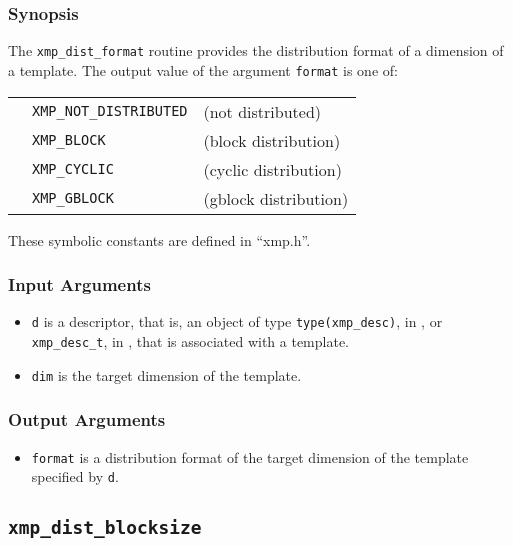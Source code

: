 \subsubsection*{Synopsis}

The {\tt xmp\_dist\_format} routine provides the distribution format of
a dimension of a template. The output value of the argument {\tt format}
is one of:

\begin{tabular}{lll}
       \hspace{2.5cm} & {\tt XMP\_NOT\_DISTRIBUTED} & (not distributed)\\
                      & {\tt XMP\_BLOCK}  & (block distribution) \\
                      & {\tt XMP\_CYCLIC} & (cyclic distribution) \\
                      & {\tt XMP\_GBLOCK} & (gblock distribution) \\
\end{tabular}

These symbolic constants are defined in ``xmp.h''.

\subsubsection*{Input Arguments}
\begin{itemize}
 \item {\tt d} is a descriptor, that is, an object of type 
       {\tt type(xmp\_desc)}, in {\XMPF}, or {\tt xmp\_desc\_t},
       in {\XMPC}, that is associated with a template.
 \item {\tt dim} is the target dimension of the template.
\end{itemize}

\subsubsection*{Output Arguments}
\begin{itemize}
 \item {\tt format} is a distribution format of the target dimension of
       the template specified by {\tt d}.
\end{itemize}


\subsection{\tt xmp\_dist\_blocksize}

